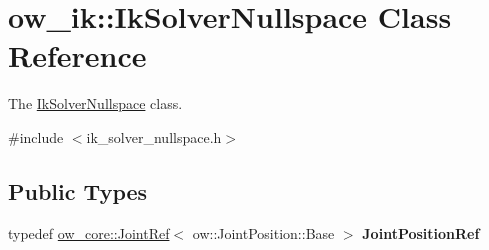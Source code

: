 \hypertarget{classow__ik_1_1IkSolverNullspace}{}\section{ow\+\_\+ik\+:\+:Ik\+Solver\+Nullspace Class Reference}
\label{classow__ik_1_1IkSolverNullspace}


The \hyperlink{classow__ik_1_1IkSolverNullspace}{Ik\+Solver\+Nullspace} class.  




{\ttfamily \#include $<$ik\+\_\+solver\+\_\+nullspace.\+h$>$}

\subsection*{Public Types}
\begin{DoxyCompactItemize}
\item 
typedef \hyperlink{classow__core_1_1JointRef}{ow\+\_\+core\+::\+Joint\+Ref}$<$ ow\+::\+Joint\+Position\+::\+Base $>$ {\bfseries Joint\+Position\+Ref}\hypertarget{classow__ik_1_1IkSolverNullspace_a5b8c544a084c8ef5790d2ad9c037fd38}{}\label{classow__ik_1_1IkSolverNullspace_a5b8c544a084c8ef5790d2ad9c037fd38}

\end{DoxyCompactItemize}
